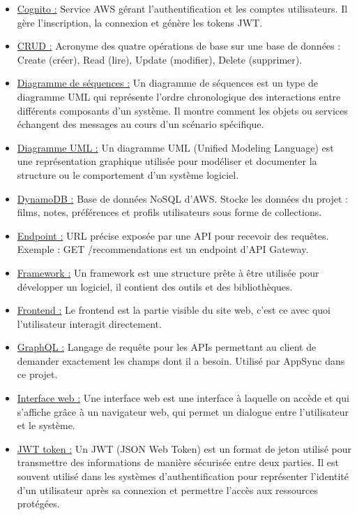 \documentclass[a4paper,12pt]{report}
\begin{document}
\begin{itemize}
     \item \underline{Cognito :} Service AWS gérant l’authentification et les comptes utilisateurs. Il gère l’inscription, la connexion et génère les tokens JWT.
     \item \underline{CRUD :} Acronyme des quatre opérations de base sur une base de données : Create (créer), Read (lire), Update (modifier), Delete (supprimer).
     \item \underline{Diagramme de séquences :} Un diagramme de séquences est un type de diagramme UML qui représente l’ordre chronologique des interactions entre différents composants d’un système. Il montre comment les objets ou services échangent des messages au cours d’un scénario spécifique.
    \item \underline{Diagramme UML :} Un diagramme UML (Unified Modeling Language) est une représentation graphique utilisée pour modéliser et documenter la structure ou le comportement d’un système logiciel.
    \item \underline{DynamoDB :} Base de données NoSQL d’AWS. Stocke les données du projet : films, notes, préférences et profils utilisateurs sous forme de collections.
    \item \underline{Endpoint :} URL précise exposée par une API pour recevoir des requêtes. Exemple : GET /recommendations est un endpoint d’API Gateway.
    \item \underline{Framework :} Un framework est une structure prête à être utilisée pour développer un logiciel, il contient des outils et des bibliothèques.
    \item \underline{Frontend :} Le frontend est la partie visible du site web, c’est ce avec quoi l’utilisateur interagit directement.
    \item \underline{GraphQL :} Langage de requête pour les APIs permettant au client de demander exactement les champs dont il a besoin. Utilisé par AppSync dans ce projet.
     \item \underline{Interface web :} Une interface web est une interface à laquelle on accède et qui s’affiche grâce à un navigateur web, qui permet un dialogue entre l’utilisateur et le système.
    \item \underline{JWT token :} Un JWT (JSON Web Token) est un format de jeton utilisé pour transmettre des informations de manière sécurisée entre deux parties. Il est souvent utilisé dans les systèmes d’authentification pour représenter l’identité d’un utilisateur après sa connexion et permettre l’accès aux ressources protégées.

\end{itemize}
\end{document}
